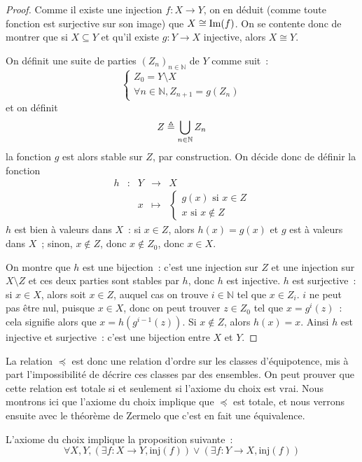 \begin{proof}
  Comme il existe une injection $f : X \to Y$, on en déduit (comme toute
  fonction est surjective sur son image) que $X \cong \operatorname{Im}(f)$. On se contente
  donc de montrer que si $X \subseteq Y$ et qu'il existe $g : Y \to X$
  injective, alors $X \cong Y$.

  On définit une suite de parties $(Z_n)_{n\in\mathbb N}$ de $Y$ comme suit~:
  \[\left\{\begin{array}{l}
  Z_0 = Y \setminus X\\
  \forall n \in \mathbb N, Z_{n+1} = g(Z_n)
  \end{array}\right.\]
  et on définit
  \[Z \triangleq \bigcup_{n \in \mathbb N} Z_n\]
  la fonction $g$ est alors stable sur $Z$, par construction. On décide donc de
  définir la fonction
  \[\begin{array}{ccccc}
  h & : & Y & \rightarrow & X \\
  & & x & \longmapsto & \left\{
  \begin{array}{l}
    g(x) \text{ si } x \in Z\\
    x \text{ si } x \notin Z
  \end{array}\right.
  \end{array}\]
  $h$ est bien à valeurs dans $X$~: si $x \in Z$, alors $h(x) = g(x)$ et
  $g$ est à valeurs dans $X$~; sinon, $x \notin Z$, donc $x\notin Z_0$, donc
  $x \in X$.

  On montre que $h$ est une bijection~: c'est une injection sur $Z$ et une
  injection sur $X\setminus Z$ et ces deux parties sont stables par $h$, donc
  $h$ est injective. $h$ est surjective~: si $x \in X$, alors soit $x \in Z$,
  auquel cas on trouve $i \in \mathbb N$ tel que $x \in Z_i$. $i$ ne peut
  pas être nul, puisque $x \in X$, donc on peut trouver $z \in Z_0$ tel que
  $x = g^i(z)$~: cela signifie alors que $x = h(g^{i-1}(z))$. Si $x \notin Z$,
  alors $h(x) = x$. Ainsi $h$ est injective et surjective~: c'est une bijection
  entre $X$ et $Y$.
\end{proof}

La relation $\preceq$ est donc une relation d'ordre sur les classes
d'équipotence, mis à part l'impossibilité de décrire ces classes par des
ensembles. On peut prouver que cette relation est totale si et seulement si
l'axiome du choix est vrai. Nous montrons ici que l'axiome du choix implique
que $\preceq$ est totale, et nous verrons ensuite avec le théorème de Zermelo
que c'est en fait une équivalence.

\begin{property}
  L'axiome du choix implique la proposition suivante~:
  \[\forall X,Y,(\exists f : X \to Y, \mathrm{inj}(f))\lor(\exists f : Y \to X,
  \mathrm{inj}(f))\]
\end{property}

